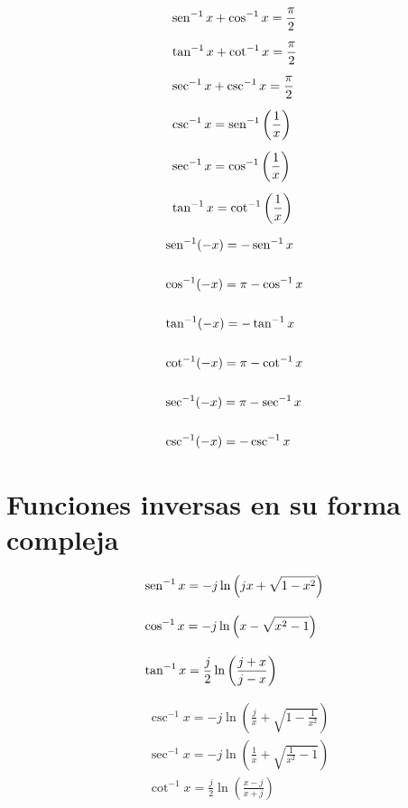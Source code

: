 \begin{minipage}[t]{0.5\textwidth}
\begin{align*}
& \operatorname{sen}^{-1} x + \cos^{-1} x = \frac{\pi}{2}\\[5pt]
& \tan^{-1} x + \cot^{-1} x = \frac{\pi}{2}\\[5pt]
& \sec^{-1} x + \csc^{-1} x = \frac{\pi}{2}\\[5pt]
& \csc^{-1} x = \operatorname{sen}^{-1} \left( \frac{1}{x} \right)\\[5pt]
& \sec^{-1} x = \cos^{-1} \left( \frac{1}{x} \right)\\[5pt]
& \tan^{-1} x = \cot^{-1} \left( \frac{1}{x} \right)
\end{align*}

\end{minipage} 
\begin{minipage}[t]{0.5\textwidth}
\begin{align*}
& \operatorname{sen}^{-1} (-x) = -\operatorname{sen}^{-1} x\\\\
& \cos^{-1} (-x) = \pi -\cos^{-1} x\\\\
& \tan^{-1} (-x) = -\tan^{-1} x\\\\
& \cot^{-1} (-x) = \pi-\cot^{-1} x\\\\
& \sec^{-1} (-x) = \pi-\sec^{-1} x\\\\
& \csc^{-1} (-x) = -\csc^{-1} x
\end{align*}
\end{minipage}

\section*{Funciones inversas en su forma compleja}

\begin{minipage}[c]{0.5\textwidth}
\begin{align*}
& \operatorname{sen}^{-1} x = -j \ln\left( jx + \sqrt{1-x^2} \right)\\[10pt]
& \cos^{-1} x = -j \ln\left( x - \sqrt{x^2-1} \right)\\[10pt]
& \tan^{-1} x = \frac{j}{2}\ln \left( \frac{j+x}{j-x} \right)
\end{align*}

\end{minipage} 
\begin{minipage}[c]{0.5\textwidth}
\begin{align*}
& \csc^{-1} x = -j\ln \left( \frac{j}{x}+\sqrt{1- \frac{1}{x^2}} \right)\\[5pt]
& \sec^{-1} x = -j\ln \left( \frac{1}{x}+\sqrt{ \frac{1}{x^2} -1} \right)\\[5pt]
& \cot^{-1} x = \frac{j}{2} \ln \left( \frac{x-j}{x+j} \right)
\end{align*}
\end{minipage}
\clearpage


